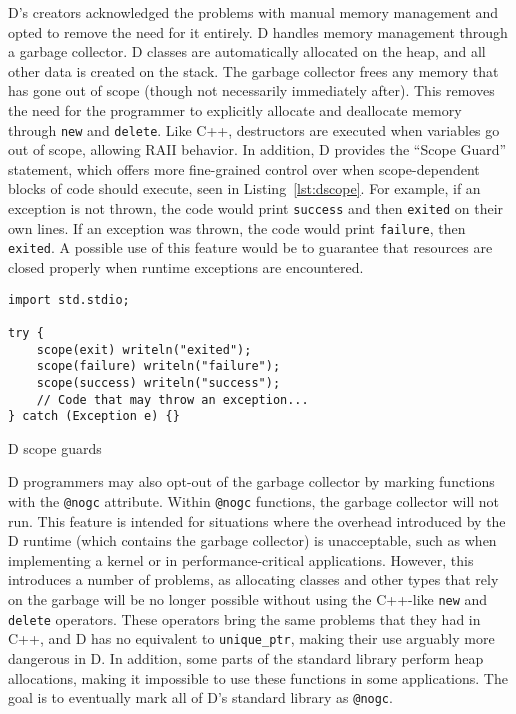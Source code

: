 \documentclass[finalcopy]{srpaper}
\begin{document}
D's creators acknowledged the problems with manual memory management and opted
to remove the need for it entirely. D handles memory management through a
garbage collector. D classes are automatically allocated on the heap, and all
other data is created on the stack. The garbage collector frees any memory that
has gone out of scope (though not necessarily immediately after). This removes
the need for the programmer to explicitly allocate and deallocate memory
through \texttt{new} and \texttt{delete}. Like C++, destructors are executed
when variables go out of scope, allowing RAII behavior. In addition, D provides
the ``Scope Guard'' statement, which offers more fine-grained control over when
scope-dependent blocks of code should execute, seen in
Listing~\ref{lst:dscope}. For example, if an exception is not thrown, the code
would print \texttt{success} and then \texttt{exited} on their own lines. If an
exception was thrown, the code would print \texttt{failure}, then
\texttt{exited}. A possible use of this feature would be to guarantee that
resources are closed properly when runtime exceptions are encountered.

\begin{listing}[H]
\begin{verbatim}
import std.stdio;

try {
    scope(exit) writeln("exited");
    scope(failure) writeln("failure");
    scope(success) writeln("success");
    // Code that may throw an exception...
} catch (Exception e) {}
\end{verbatim}
\caption{D scope guards}
\label{lst:dscope}
\end{listing}

D programmers may also opt-out of the garbage collector by marking functions
with the \texttt{@nogc} attribute. Within \texttt{@nogc} functions, the garbage
collector will not run. This feature is intended for situations where the
overhead introduced by the D runtime (which contains the garbage collector) is
unacceptable, such as when implementing a kernel or in performance-critical
applications. However, this introduces a number of problems, as allocating
classes and other types that rely on the garbage will be no longer possible
without using the C++-like \texttt{new} and \texttt{delete} operators. These
operators bring the same problems that they had in C++, and D has no equivalent
to \texttt{unique\_ptr}, making their use arguably more dangerous in D. In
addition, some parts of the standard library perform heap allocations, making
it impossible to use these functions in some applications. The goal is to
eventually mark all of D's standard library as \texttt{@nogc}.
\end{document}
